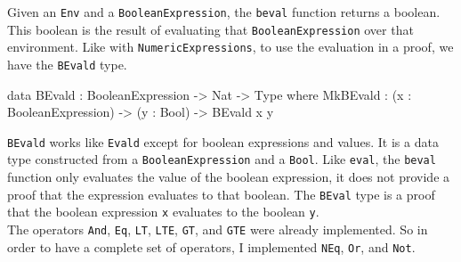         Given an \texttt{Env} and a \texttt{BooleanExpression}, the \texttt{beval} function returns a boolean. This boolean is the result of evaluating that \texttt{BooleanExpression} over that environment. Like with \texttt{NumericExpressions}, to use the evaluation in a proof, we have the \texttt{BEvald} type.
        \begin{code}[caption={\texttt{BEvald} as defined in the \Idris model}]
data BEvald : BooleanExpression -> Nat -> Type where
    MkBEvald : (x : BooleanExpression) -> (y : Bool) -> BEvald x y
        \end{code}
        \texttt{BEvald} works like \texttt{Evald} except for boolean expressions and values. It is a data type constructed from a \texttt{BooleanExpression} and a \texttt{Bool}. Like \texttt{eval}, the \texttt{beval} function only evaluates the value of the boolean expression, it does not provide a proof that the expression evaluates to that boolean. The \texttt{BEval} type is a proof that the boolean expression \texttt{x} evaluates to the boolean \texttt{y}.
        \\
        
        The operators \texttt{And}, \texttt{Eq}, \texttt{LT}, \texttt{LTE}, \texttt{GT}, and \texttt{GTE} were already implemented. So in order to have a complete set of operators, I implemented \texttt{NEq}, \texttt{Or}, and \texttt{Not}.


